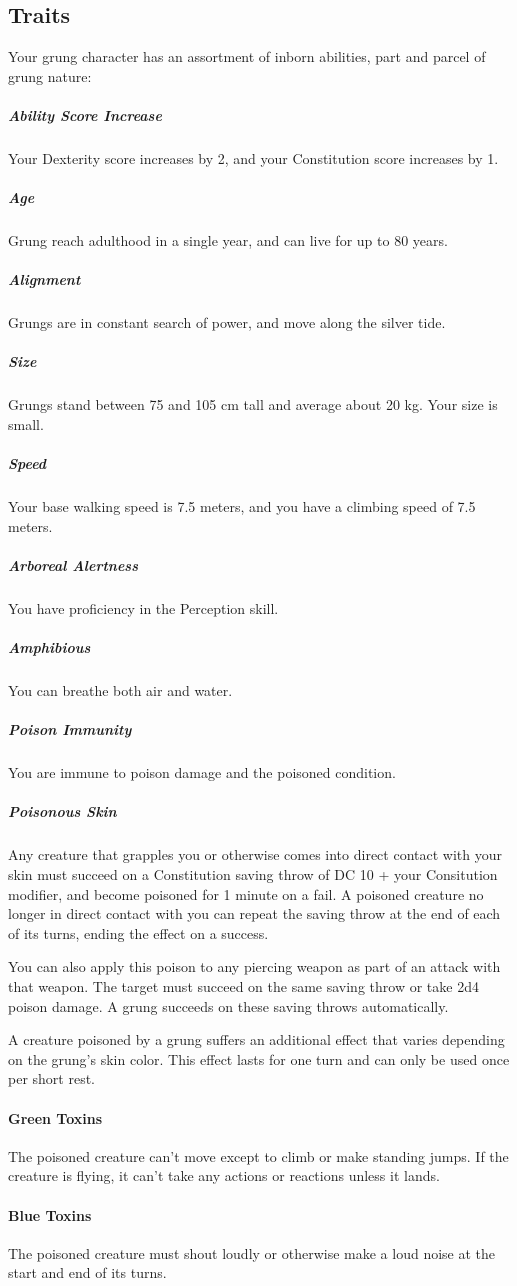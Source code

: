 \begin{linenumbers}
\subsection*{Traits}
Your grung character has an assortment of inborn abilities, part and parcel of grung nature:
\subparagraph{Ability Score Increase} Your Dexterity score increases by 2, and your Constitution score increases by 1.
\subparagraph{Age} Grung reach adulthood in a single year, and can live for up to 80 years.
\subparagraph{Alignment} %
Grungs are in constant search of power, and move along the silver tide.
\subparagraph{Size} Grungs stand between 75 and 105 cm tall and average about 20 kg.
Your size is small.
\subparagraph{Speed} Your base walking speed is 7.5 meters, and you have a climbing speed of 7.5 meters.
\subparagraph{Arboreal Alertness} You have proficiency in the Perception skill.
\subparagraph{Amphibious} You can breathe both air and water.
\subparagraph{Poison Immunity} You are immune to poison damage and the poisoned condition.
\subparagraph{Poisonous Skin} Any creature that grapples you or otherwise comes into direct contact with your skin must succeed on a Constitution saving throw of DC 10 + your Consitution modifier, and become poisoned for 1 minute on a fail.
A poisoned creature no longer in direct contact with you can repeat the saving throw at the end of each of its turns, ending the effect on a success.

You can also apply this poison to any piercing weapon as part of an attack with that weapon. %
The target must succeed on the same saving throw or take 2d4 poison damage.
A grung succeeds on these saving throws automatically.

A creature poisoned by a grung suffers an additional effect that varies depending on the grung's skin color.
This effect lasts for one turn and can only be used once per short rest.

\paragraph{Green Toxins} The poisoned creature can't move except to climb or make standing jumps.
If the creature is flying, it can't take any actions or reactions unless it lands.
\paragraph{Blue Toxins} The poisoned creature must shout loudly or otherwise make a loud noise at the start and end of its turns.

\end{linenumbers}
